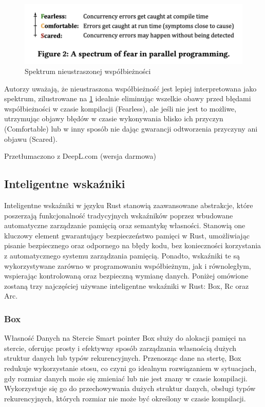 \begin{figure}[H]
    \centering
    \includegraphics[width=0.5\linewidth]{images/FearlesRustExplain.png}
    \caption{Spektrum nieustraszonej współbieżności \cite{WhenIsParallelismFearlessandZeroCostwithRust?}}
    \label{fig:FearlessSpectrum}
\end{figure}
Autorzy \cite{WhenIsParallelismFearlessandZeroCostwithRust?}
uważają, że nieustraszona współbieżność jest lepiej interpretowana jako spektrum, zilustrowane na \ref{fig:FearlessSpectrum} idealnie eliminując wszelkie obawy przed błędami współbieżności w czasie kompilacji (Fearless), ale jeśli nie jest to możliwe, utrzymując objawy błędów w czasie wykonywania blisko ich przyczyn (Comfortable) lub w inny sposób nie dając gwarancji odtworzenia przyczyny ani objawu (Scared).

Przetłumaczono z DeepL.com (wersja darmowa)

\subsection{Inteligentne wskaźniki }
Inteligentne wskaźniki w języku Rust stanowią zaawansowane abstrakcje, które poszerzają funkcjonalność tradycyjnych wskaźników poprzez wbudowane automatyczne zarządzanie pamięcią oraz semantykę własności. Stanowią one kluczowy element gwarantujący bezpieczeństwo pamięci w Rust, umożliwiając pisanie bezpiecznego oraz odpornego na błędy kodu, bez konieczności korzystania z automatycznego systemu zarządzania pamięcią. Ponadto, wskaźniki te są wykorzystywane zarówno w programowaniu współbieżnym, jak i równoległym, wspierając kontrolowaną oraz bezpieczną wymianę danych. Poniżej omówione zostaną trzy najczęściej używane inteligentne wskaźniki w Rust: Box, Rc oraz Arc.

\subsubsection{Box}
\label{BOX}
Własność Danych na Stercie
Smart pointer Box służy do alokacji pamięci na stercie, oferując prosty i efektywny sposób zarządzania własnością dużych struktur danych lub typów rekurencyjnych. Przenosząc dane na stertę, Box redukuje wykorzystanie stosu, co czyni go idealnym rozwiązaniem w sytuacjach, gdy rozmiar danych może się zmieniać lub nie jest znany w czasie kompilacji.\\
Wykorzystuje się go do przechowywania dużych struktur danych, obsługi typów rekurencyjnych, których rozmiar nie może być określony w czasie kompilacji.

